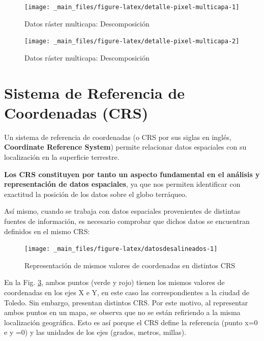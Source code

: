 \documentclass[
]{book}
\begin{document}
\begin{figure}

{\centering \texttt{[image: \_main\_files/figure-latex/detalle-pixel-multicapa-1]} 

}

\caption{Datos ráster multicapa: Descomposición}\label{fig:detalle-pixel-multicapa-1}
\end{figure}
\begin{figure}

{\centering \texttt{[image: \_main\_files/figure-latex/detalle-pixel-multicapa-2]} 

}

\caption{Datos ráster multicapa: Descomposición}\label{fig:detalle-pixel-multicapa-2}
\end{figure}

\hypertarget{CRS}{%
\section{Sistema de Referencia de Coordenadas (CRS)}\label{CRS}}

Un sistema de referencia de coordenadas (o CRS por sus siglas en inglés,
\textbf{Coordinate Reference System}) permite relacionar datos espaciales con su
localización en la superficie terrestre.

\textbf{Los CRS constituyen por tanto un aspecto fundamental en el análisis y
representación de datos espaciales}, ya que nos permiten identificar con
exactitud la posición de los datos sobre el globo terráqueo.

Así mismo, cuando se trabaja con datos espaciales provenientes de distintas
fuentes de información, es necesario comprobar que dichos datos se encuentran
definidos en el mismo CRS:

\begin{figure}

{\centering \texttt{[image: \_main\_files/figure-latex/datosdesalineados-1]} 

}

\caption{Representación de mismos valores de coordenadas en distintos CRS}\label{fig:datosdesalineados}
\end{figure}

En la Fig. \ref{fig:datosdesalineados}, ambos puntos (verde y rojo) tienen los
mismos valores de coordenadas en los ejes X e Y, en este caso las
correspondientes a la ciudad de Toledo. Sin embargo, presentan distintos CRS.
Por este motivo, al representar ambos puntos en un mapa, se observa que no se
están refiriendo a la misma localización geográfica. Esto es así porque el CRS
define la referencia (punto x=0 e y =0) y las unidades de los ejes (grados,
metros, millas).
\end{document}
